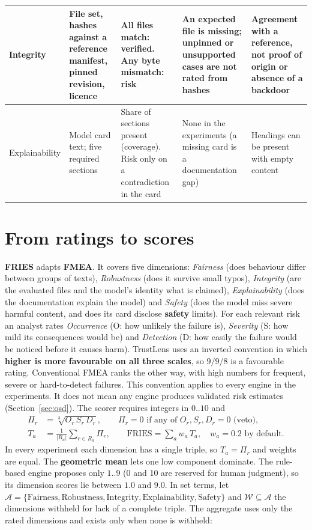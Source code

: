 \begin{table}[!htbp]
\begin{tabularx}{\textwidth}{|>{\raggedright\arraybackslash}p{1.8cm}|>{\raggedright\arraybackslash}p{2.8cm}|>{\raggedright\arraybackslash}p{3.1cm}|>{\raggedright\arraybackslash}p{3.0cm}|L|}
Integrity & File set, hashes against a reference manifest, pinned revision, licence & All files match: verified. Any byte mismatch: risk & An expected file is missing; unpinned or unsupported cases are not rated from hashes & Agreement with a reference, not proof of origin or absence of a backdoor\\ \hline
Explainability & Model card text; five required sections & Share of sections present (coverage). Risk only on a contradiction in the card & None in the experiments (a missing card is a documentation gap) & Headings can be present with empty content\\
\hline
\end{tabularx}
\end{table}

\section{From ratings to scores}
\textbf{FRIES} \cite{rutinowski2024} adapts \textbf{FMEA}. It covers five dimensions: \emph{Fairness} (does behaviour differ between groups of texts), \emph{Robustness} (does it survive small typos), \emph{Integrity} (are the evaluated files and the model's identity what is claimed), \emph{Explainability} (does the documentation explain the model) and \emph{Safety} (does the model miss severe harmful content, and does its card disclose \textbf{safety} limits). For each relevant risk an analyst rates \emph{Occurrence} (O: how unlikely the failure is), \emph{Severity} (S: how mild its consequences would be) and \emph{Detection} (D: how easily the failure would be noticed before it causes harm). TrustLens uses an inverted convention in which \textbf{higher is more favourable on all three scales}, so $9/9/8$ is a favourable rating. Conventional FMEA ranks the other way, with high numbers for frequent, severe or hard-to-detect failures. This convention applies to every engine in the experiments. It does not mean any engine produces validated risk estimates (Section~\ref{sec:osd}). The scorer requires integers in $0..10$ and
\begin{align}
\Pi_r &= \sqrt[3]{O_r\, S_r\, D_r}, \qquad \Pi_r = 0 \text{ if any of } O_r,S_r,D_r = 0 \text{ (veto)},\label{eq:pi}\\
T_a &= \frac{1}{|R_a|}\sum_{r\in R_a}\Pi_r, \qquad
\text{FRIES} = \sum_{a} w_a\, T_a, \quad w_a = 0.2 \text{ by default.}\label{eq:fries}
\end{align}
In every experiment each dimension has a single triple, so $T_a=\Pi_r$ and weights are equal. The \textbf{geometric mean} lets one low component dominate. The rule-based engine proposes only $1..9$ (0 and 10 are reserved for human judgment), so its dimension scores lie between $1.0$ and $9.0$. In set terms, let $\mathcal A=\{\text{Fairness},\text{Robustness},\text{Integrity},\text{Explainability},\text{Safety}\}$ and $\mathcal W\subseteq\mathcal A$ the dimensions withheld for lack of a complete triple. The aggregate uses only the rated dimensions and exists only when none is withheld:
